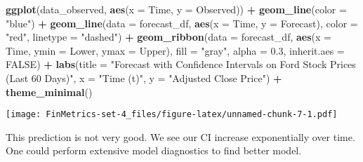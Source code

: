\documentclass[
]{article}
\newenvironment{Shaded}{\begin{snugshade}}{\end{snugshade}}
\newcommand{\AttributeTok}[1]{\textcolor[rgb]{0.13,0.29,0.53}{#1}}
\newcommand{\ConstantTok}[1]{\textcolor[rgb]{0.56,0.35,0.01}{#1}}
\newcommand{\FloatTok}[1]{\textcolor[rgb]{0.00,0.00,0.81}{#1}}
\newcommand{\FunctionTok}[1]{\textcolor[rgb]{0.13,0.29,0.53}{\textbf{#1}}}
\newcommand{\NormalTok}[1]{#1}
\newcommand{\SpecialCharTok}[1]{\textcolor[rgb]{0.81,0.36,0.00}{\textbf{#1}}}
\newcommand{\StringTok}[1]{\textcolor[rgb]{0.31,0.60,0.02}{#1}}
\begin{document}
\begin{Shaded}
\begin{Highlighting}[]
\FunctionTok{ggplot}\NormalTok{(data\_observed, }\FunctionTok{aes}\NormalTok{(}\AttributeTok{x =}\NormalTok{ Time, }\AttributeTok{y =}\NormalTok{ Observed)) }\SpecialCharTok{+}
  \FunctionTok{geom\_line}\NormalTok{(}\AttributeTok{color =} \StringTok{"blue"}\NormalTok{) }\SpecialCharTok{+}
  \FunctionTok{geom\_line}\NormalTok{(}\AttributeTok{data =}\NormalTok{ forecast\_df, }\FunctionTok{aes}\NormalTok{(}\AttributeTok{x =}\NormalTok{ Time, }\AttributeTok{y =}\NormalTok{ Forecast), }\AttributeTok{color =} \StringTok{"red"}\NormalTok{, }\AttributeTok{linetype =} \StringTok{"dashed"}\NormalTok{) }\SpecialCharTok{+}
  \FunctionTok{geom\_ribbon}\NormalTok{(}\AttributeTok{data =}\NormalTok{ forecast\_df, }\FunctionTok{aes}\NormalTok{(}\AttributeTok{x =}\NormalTok{ Time, }\AttributeTok{ymin =}\NormalTok{ Lower, }\AttributeTok{ymax =}\NormalTok{ Upper),}
              \AttributeTok{fill =} \StringTok{"gray"}\NormalTok{, }\AttributeTok{alpha =} \FloatTok{0.3}\NormalTok{, }\AttributeTok{inherit.aes =} \ConstantTok{FALSE}\NormalTok{) }\SpecialCharTok{+}
  \FunctionTok{labs}\NormalTok{(}\AttributeTok{title =} \StringTok{"Forecast with Confidence Intervals on Ford Stock Prices (Last 60 Days)"}\NormalTok{,}
       \AttributeTok{x =} \StringTok{"Time (t)"}\NormalTok{, }\AttributeTok{y =} \StringTok{"Adjusted Close Price"}\NormalTok{) }\SpecialCharTok{+}
  \FunctionTok{theme\_minimal}\NormalTok{()}
\end{Highlighting}
\end{Shaded}

\texttt{[image: FinMetrics-set-4\_files/figure-latex/unnamed-chunk-7-1.pdf]}

This prediction is not very good. We see our CI increase exponentially
over time. One could perform extensive model diagnostics to find better
model.
\end{document}

